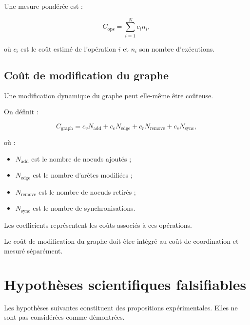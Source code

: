 \documentclass[11pt,a4paper]{article}
\begin{document}
Une mesure pondérée est :

\[
C_{\mathrm{ops}}
=
\sum_{i=1}^{N}c_i n_i,
\]

où $c_i$ est le coût estimé de l'opération $i$ et $n_i$ son
nombre d'exécutions.

\subsection{Coût de modification du graphe}

Une modification dynamique du graphe peut elle-même être coûteuse.

On définit :

\[
C_{\mathrm{graph}}
=
c_v N_{\mathrm{add}}
+
c_e N_{\mathrm{edge}}
+
c_r N_{\mathrm{remove}}
+
c_s N_{\mathrm{sync}},
\]

où :
\begin{itemize}
  \item $N_{\mathrm{add}}$ est le nombre de noeuds ajoutés ;
  \item $N_{\mathrm{edge}}$ est le nombre d'arêtes modifiées ;
  \item $N_{\mathrm{remove}}$ est le nombre de noeuds retirés ;
  \item $N_{\mathrm{sync}}$ est le nombre de synchronisations.
\end{itemize}

Les coefficients représentent les coûts associés à ces opérations.

Le coût de modification du graphe doit être intégré au coût
de coordination et mesuré séparément.

\section{Hypothèses scientifiques falsifiables}

Les hypothèses suivantes constituent des propositions expérimentales.
Elles ne sont pas considérées comme démontrées.
\end{document}
